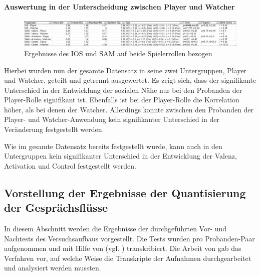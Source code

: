 \paragraph{Auswertung in der Unterscheidung zwischen Player und Watcher}

\begin{figure}[ht]
\centering
\includegraphics[width=1\linewidth]{content/pictures/IOS_SAM_Player_Watcher.png}
\caption{Ergebnisse des \ac{IOS} und \ac{SAM} auf beide Spielerrollen bezogen}
\label{fig:ios_sam_roles}
\end{figure}

Hierbei wurden nun der gesamte Datensatz in seine zwei Untergruppen, Player und Watcher, geteilt und getrennt ausgewertet. Es zeigt sich, dass der signifikante Unterschied in der Entwicklung der sozialen Nähe nur bei den Probanden der Player-Rolle signifikant ist. Ebenfalls ist bei der Player-Rolle die Korrelation höher, als bei denen der Watcher. Allerdings konnte zwischen den Probanden der Player- und Watcher-Anwendung kein signifikanter Unterschied in der Veränderung festgestellt werden.

Wie im gesamte Datensatz bereits festgestellt wurde, kann auch in den Untergruppen kein signifikanter Unterschied in der Entwicklung der Valenz, Activation und Control festgestellt werden.

\subsection{Vorstellung der Ergebnisse der Quantisierung der Gesprächsflüsse}
In diesem Abschnitt werden die Ergebnisse der durchgeführten Vor- und Nachtests des Versuchsaufbaus vorgestellt. Die Tests wurden pro Probanden-Paar aufgenommen und mit Hilfe von  (vgl. \cite{bain_whisperx_2023}) transkribiert. Die Arbeit von \cite{nasir_effect_2015} gab das Verfahren vor, auf welche Weise die Transkripte der Aufnahmen durchgearbeitet und analysiert werden mussten.

